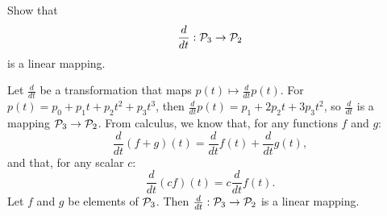 \documentclass{ximera}
\begin{document}
\begin{exercise}  \label{c7.2.2a}
Show that
\[
\frac{d}{dt}:{\cal P}_3\to{\cal P}_2
\]
is a linear mapping.

\begin{solution}

Let $\frac{d}{dt}$ be a transformation that maps $p(t) \mapsto
\frac{d}{dt}p(t)$.  For $p(t) =  p_0 + p_1t + p_2t^2 + p_3t^3$, then
$\frac{d}{dt}p(t) = p_1 + 2p_2t + 3p_3t^2$, so $\frac{d}{dt}$ is 
a mapping ${\cal P}_3 \rightarrow {\cal P}_2$.  From calculus, we
know that, for any functions $f$ and $g$:
\[ 
\frac{d}{dt}(f + g)(t) = \frac{d}{dt}f(t) + \frac{d}{dt}g(t), 
\]
and that, for any scalar $c$:
\[ 
\frac{d}{dt}(cf)(t) = c\frac{d}{dt}f(t). 
\]
Let $f$ and $g$ be elements of ${\cal P}_3$.  Then
$\frac{d}{dt}: {\cal P}_3 \rightarrow {\cal P}_2$ is a linear mapping.

\end{solution}
\end{exercise}
\end{document}
